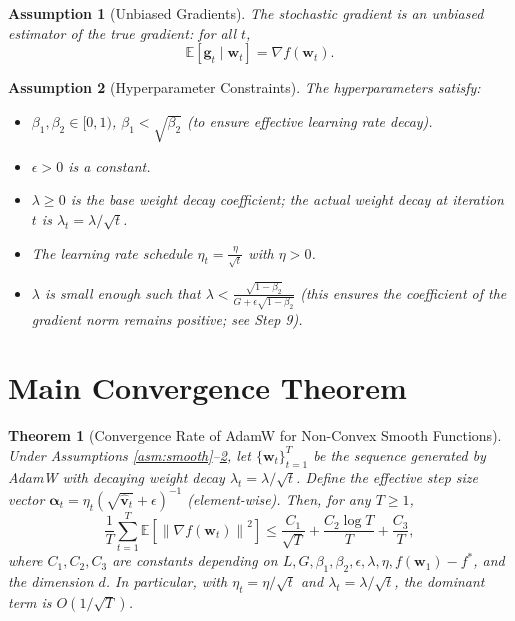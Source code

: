 \documentclass{article}
\theoremstyle{plain}
\newtheorem{assumption}{Assumption}
\newtheorem{theorem}{Theorem}
\theoremstyle{definition}
\renewcommand{\vec}[1]{\boldsymbol{#1}}
\newcommand{\norm}[1]{\left\| #1 \right\|}
\newcommand{\expect}[1]{\mathbb{E}\left[ #1 \right]}
\begin{document}
\begin{assumption}[Unbiased Gradients] \label{asm:unbiased}
The stochastic gradient is an unbiased estimator of the true gradient: for all $t$,
\begin{equation}
    \expect{\vec{g}_t \mid \vec{w}_t} = \nabla f(\vec{w}_t).
\end{equation}
\end{assumption}


\begin{assumption}[Hyperparameter Constraints] \label{asm:hyper}
The hyperparameters satisfy:
\begin{itemize}
    \item $\beta_1, \beta_2 \in [0,1)$, $\beta_1 < \sqrt{\beta_2}$ (to ensure effective learning rate decay).
    \item $\epsilon > 0$ is a constant.
    \item $\lambda \ge 0$ is the base weight decay coefficient; the actual weight decay at iteration $t$ is $\lambda_t = \lambda / \sqrt{t}$.
    \item The learning rate schedule $\eta_t = \frac{\eta}{\sqrt{t}}$ with $\eta > 0$.
    \item $\lambda$ is small enough such that $\lambda < \frac{\sqrt{1-\beta_2}}{G + \epsilon\sqrt{1-\beta_2}}$ (this ensures the coefficient of the gradient norm remains positive; see Step 9).
\end{itemize}
\end{assumption}

\section*{Main Convergence Theorem}

\begin{theorem}[Convergence Rate of AdamW for Non-Convex Smooth Functions] \label{thm:main}
Under Assumptions \ref{asm:smooth}--\ref{asm:hyper}, let $\{\vec{w}_t\}_{t=1}^T$ be the sequence generated by AdamW with decaying weight decay $\lambda_t = \lambda/\sqrt{t}$. Define the effective step size vector $\vec{\alpha}_t = \eta_t (\sqrt{\hat{\vec{v}}_t} + \epsilon)^{-1}$ (element-wise). Then, for any $T \ge 1$,
\begin{equation}
    \frac{1}{T} \sum_{t=1}^T \expect{\norm{\nabla f(\vec{w}_t)}^2} \le \frac{C_1}{\sqrt{T}} + \frac{C_2 \log T}{T} + \frac{C_3}{T},
\end{equation}
where $C_1, C_2, C_3$ are constants depending on $L, G, \beta_1, \beta_2, \epsilon, \lambda, \eta, f(\vec{w}_1) - f^*$, and the dimension $d$. In particular, with $\eta_t = \eta / \sqrt{t}$ and $\lambda_t = \lambda / \sqrt{t}$, the dominant term is $O(1/\sqrt{T})$.
\end{theorem}
\end{document}
